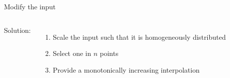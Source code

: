 \documentclass[aspectratio=169,10pt]{beamer}
\begin{document}
\begin{frame}{Modify the input}
\begin{columns}
Solution:
\begin{enumerate}
\item<1-|alert@1-2> Scale the input such that it is homogeneously distributed
\item<1-|alert@3> Select one in $n$ points  
\item<1-|alert@4> Provide a monotonically increasing interpolation
\end{enumerate}


\end{columns}


\end{frame}
\end{document}
